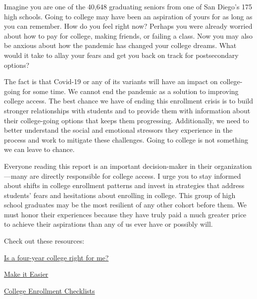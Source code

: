 \documentclass[
  11pt,
]{article}
\begin{document}
\newpage{}


Imagine you are one of the 40,648 graduating seniors from one of San
Diego's 175 high schools. Going to college may have been an aspiration
of yours for as long as you can remember. How do you feel right now?
Perhaps you were already worried about how to pay for college, making
friends, or failing a class. Now you may also be anxious about how the
pandemic has changed your college dreams. What would it take to allay
your fears and get you back on track for postsecondary options?

The fact is that Covid-19 or any of its variants will have an impact on
college-going for some time. We cannot end the pandemic as a solution to
improving college access. The best chance we have of ending this
enrollment crisis is to build stronger relationships with students and
to provide them with information about their college-going options that
keeps them progressing. Additionally, we need to better understand the
social and emotional stressors they experience in the process and work
to mitigate these challenges. Going to college is not something we can
leave to chance.

Everyone reading this report is an important decision-maker in their
organization---many are directly responsible for college access. I urge
you to stay informed about shifts in college enrollment patterns and
invest in strategies that address students' fears and hesitations about
enrolling in college. This group of high school graduates may be the
most resilient of any other cohort before them. We must honor their
experiences because they have truly paid a much greater price to achieve
their aspirations than any of us ever have or possibly will.

\vspace{10mm}
\begin{tcolorbox}[colback=sdcoelightblue!5, colframe=sdcoelightblue!75]

Check out these resources:

\begin{sdcoebullets}
  \item \href{https://resources.finalsite.net/images/v1633543351/sdcoenet/n9ck4tbjbsexckrvxrgb/CollegeAccess-Brochure.pdf}{Is a four-year college right for me?}
  \item \href{https://resources.finalsite.net/images/v1639429972/sdcoenet/kmq4ljy195amwtiinc4w/MakeItEasier-Report.pdf}{Make it Easier}
  \item \href{https://www.sdcoe.net/educators/evaluation/improvement-networks#fs-panel-2947}{College Enrollment Checklists}
\end{sdcoebullets}
\end{tcolorbox}

\end{document}
